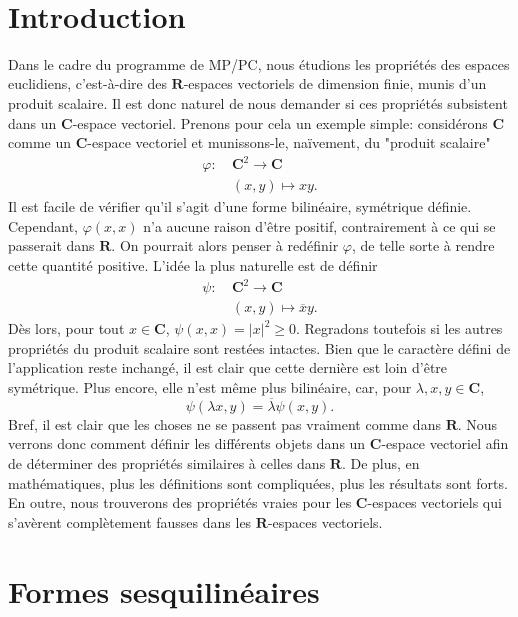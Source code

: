 \documentclass[a4paper,11pt]{article}
\newcommand{\R}{\mathbf{R}}
\newcommand{\C}{\mathbf{C}}
\newcommand{\titre}[1]{
		\colorbox{vert1}{
		\parbox{\headwidth}{
			\center{\Large{\sffamily\bfseries{\color{gris}{#1}}}}\\
			\vspace*{1em}
		}}
	}
\begin{document}
\thispagestyle{empty}				%
\pagecolor{gris}						%
\titre{Espaces hermitiens}			%
\vspace*{1em}

\section*{Introduction}
Dans le cadre du programme de MP/PC, nous étudions les propriétés des espaces euclidiens, c'est-à-dire des $\R$-espaces vectoriels de dimension finie, munis d'un produit scalaire. Il est donc naturel de nous demander si ces propriétés subsistent dans un $\C$-espace vectoriel. Prenons pour cela un exemple simple: considérons $\C$ comme un $\C$-espace vectoriel et munissons-le, naïvement, du "produit scalaire"
\begin{align*}
\varphi:\ &\C^2\rightarrow\C\\
&(x,y)\mapsto xy.
\end{align*}
Il est facile de vérifier qu'il s'agit d'une forme bilinéaire, symétrique définie. Cependant, $\varphi(x,x)$ n'a aucune raison d'être positif, contrairement à ce qui se passerait dans $\R$. On pourrait alors penser à redéfinir $\varphi$, de telle sorte à rendre cette quantité positive. L'idée la plus naturelle est de définir
\begin{align*}
\psi:\ &\C^2\rightarrow\C\\
&(x,y)\mapsto \overline{x}y.
\end{align*} 
Dès lors, pour tout $x\in\C$, $\psi(x,x)=\vert x\vert^2\geq 0$. Regradons toutefois si les autres propriétés du produit scalaire sont restées intactes. Bien que le caractère défini de l'application reste inchangé, il est clair que cette dernière est loin d'être symétrique. Plus encore, elle n'est même plus bilinéaire, car, pour $\lambda,x,y\in\C$, \[\psi(\lambda x,y)=\overline{\lambda}\psi(x,y).\]
Bref, il est clair que les choses ne se passent pas vraiment comme dans $\R$. Nous verrons donc comment définir les différents objets dans un $\C$-espace vectoriel afin de déterminer des propriétés similaires à celles dans $\R$. De plus, en mathématiques, plus les définitions sont compliquées, plus les résultats sont forts. En outre, nous trouverons des propriétés vraies pour les $\C$-espaces vectoriels qui s'avèrent complètement fausses dans les $\R$-espaces vectoriels.

\section{Formes sesquilinéaires}
\end{document}

